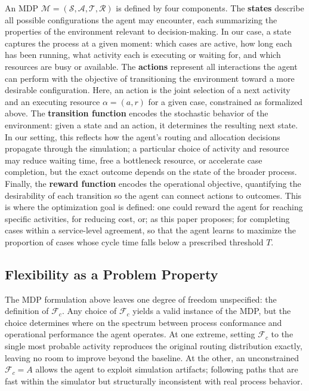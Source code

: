 \documentclass[runningheads]{llncs}
\begin{document}
An MDP $\mathcal{M}=(\mathcal{S},\mathcal{A},\mathcal{T},\mathcal{R})$
is defined by four components. The \textbf{states} describe all
possible configurations the agent may encounter, each summarizing the
properties of the environment relevant to decision-making. In our case, a
state captures the process at a given moment: which cases are active, how long
each has been running, what activity each is executing or waiting for, and
which resources are busy or available. The \textbf{actions} represent all
interactions the agent can perform with the objective of transitioning the
environment toward a more desirable configuration. Here, an action is the
joint selection of a next activity and an executing resource $\alpha=(a,r)$
for a given case, constrained as formalized above. The \textbf{transition
function} encodes the stochastic behavior of the environment: given a state
and an action, it determines the resulting next state. In our setting, this
reflects how the agent's routing and allocation decisions propagate through
the simulation; a particular choice of activity and resource may reduce
waiting time, free a bottleneck resource, or accelerate case completion,
but the exact outcome depends on the state of the broader process. Finally,
the \textbf{reward function} encodes the operational objective, quantifying
the desirability of each transition so the agent can connect actions to
outcomes. This is where the optimization goal is defined: one could reward
the agent for reaching specific activities, for reducing cost, or; as this
paper proposes; for completing cases within a service-level agreement, so
that the agent learns to maximize the proportion of cases whose cycle time
falls below a prescribed threshold $T$.

\subsection{Flexibility as a Problem Property}
\label{subsec:flexibility}

The MDP formulation above leaves one degree of freedom unspecified: the
definition of $\mathcal{F}_c$. Any choice of $\mathcal{F}_c$ yields a valid
instance of the MDP, but the choice determines where on the spectrum between
process conformance and operational performance the agent operates. At one
extreme, setting $\mathcal{F}_c$ to the single most probable activity
reproduces the original routing distribution exactly, leaving no room to
improve beyond the baseline. At the other, an unconstrained
$\mathcal{F}_c=A$ allows the agent to exploit simulation artifacts; following
paths that are fast within the simulator but structurally inconsistent with
real process behavior.
\end{document}
